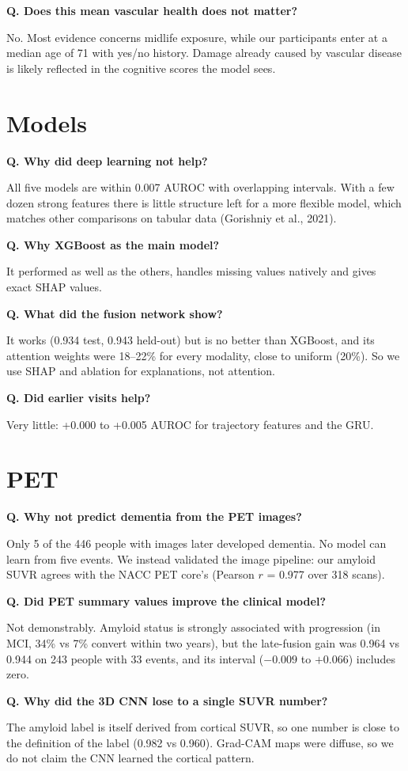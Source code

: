 \documentclass[11pt,a4paper]{article}
\newcommand{\q}[1]{\par\medskip\textbf{Q. #1}\par}
\begin{document}
\q{Does this mean vascular health does not matter?}
No. Most evidence concerns midlife exposure, while our participants enter at a median age of 71 with yes/no history. Damage already caused by vascular disease is likely reflected in the cognitive scores the model sees.

\section{Models}

\q{Why did deep learning not help?}
All five models are within 0.007 AUROC with overlapping intervals. With a few dozen strong features there is little structure left for a more flexible model, which matches other comparisons on tabular data (Gorishniy et al., 2021).

\q{Why XGBoost as the main model?}
It performed as well as the others, handles missing values natively and gives exact SHAP values.

\q{What did the fusion network show?}
It works (0.934 test, 0.943 held-out) but is no better than XGBoost, and its attention weights were 18--22\% for every modality, close to uniform (20\%). So we use SHAP and ablation for explanations, not attention.

\q{Did earlier visits help?}
Very little: +0.000 to +0.005 AUROC for trajectory features and the GRU.

\section{PET}

\q{Why not predict dementia from the PET images?}
Only 5 of the 446 people with images later developed dementia. No model can learn from five events. We instead validated the image pipeline: our amyloid SUVR agrees with the NACC PET core's (Pearson $r$ = 0.977 over 318 scans).

\q{Did PET summary values improve the clinical model?}
Not demonstrably. Amyloid status is strongly associated with progression (in MCI, 34\% vs 7\% convert within two years), but the late-fusion gain was 0.964 vs 0.944 on 243 people with 33 events, and its interval ($-0.009$ to $+0.066$) includes zero.

\q{Why did the 3D CNN lose to a single SUVR number?}
The amyloid label is itself derived from cortical SUVR, so one number is close to the definition of the label (0.982 vs 0.960). Grad-CAM maps were diffuse, so we do not claim the CNN learned the cortical pattern.
\end{document}
